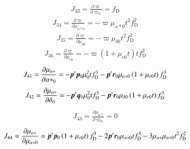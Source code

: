 \documentclass{aa}
\def\vec#1{\ensuremath{\mathchoice{\mbox{\boldmath$\displaystyle#1$}}
{\mbox{\boldmath$\textstyle#1$}}
{\mbox{\boldmath$\scriptstyle#1$}}
{\mbox{\boldmath$\scriptscriptstyle#1$}}}}
\begin{document}
\begin{equation*}
 \begin{aligned}
    J_{33}=\frac{\partial\varpi}{\partial\varpi_0}=f_\mathrm{D}
 \end{aligned}
\end{equation*}
\begin{equation*}
 \begin{aligned}
    J_{34}=\frac{\partial\varpi}{\partial\mu_{\alpha*0}}=
    -\varpi\mu_{\alpha*0}t^2f_\mathrm{D}^2
 \end{aligned}
\end{equation*}
\begin{equation*}
 \begin{aligned}
    J_{35}=\frac{\partial\varpi}{\partial\mu_{\delta0}}=
    -\varpi\mu_{\delta0}t^2f_\mathrm{D}^2
 \end{aligned}
\end{equation*}
\begin{equation*}
 \begin{aligned}
    J_{36}=\frac{\partial\varpi}{\partial\mu_{r0}}=
    -\varpi\left(1+\mu_{r0}t\right)tf_\mathrm{D}^2
 \end{aligned}
\end{equation*}
\begin{equation*}
 \begin{aligned}
    J_{41}=\frac{\partial\mu_{\alpha*}}{\partial{\alpha*}_0}=
    -\vec{p}'\vec{p}_0\mu_0^2tf_\mathrm{D}^3
    -\vec{p}'\vec{r}_0\mu_{\alpha*0}\left(1+\mu_{r0}t\right)f_\mathrm{D}^3
 \end{aligned}
\end{equation*}
\begin{equation*}
 \begin{aligned}
    J_{42}=\frac{\partial\mu_{\alpha*}}{\partial\delta_0}=
    -\vec{p}'\vec{q}_0\mu_0^2tf_\mathrm{D}^3
    -\vec{p}'\vec{r}_0\mu_{\delta0}\left(1+\mu_{r0}t\right)f_\mathrm{D}^3
 \end{aligned}
\end{equation*}
\begin{equation*}
 \begin{aligned}
    J_{43}=\frac{\partial\mu_{\alpha*}}{\partial\varpi_0}=0
 \end{aligned}
\end{equation*}
\begin{equation*}
 \begin{aligned}
    J_{44}=\frac{\partial\mu_{\alpha*}}{\partial\mu_{\alpha*0}} =
    \vec{p}'\vec{p}_0\left(1+\mu_{r0}t\right)f_\mathrm{D}^3
    -2\vec{p}'\vec{r}_0\mu_{\alpha*0}tf_\mathrm{D}^3
    -3\mu_{\alpha*}\mu_{\alpha*0}t^2f_\mathrm{D}^2 \\
 \end{aligned}
\end{equation*}
\end{document}
